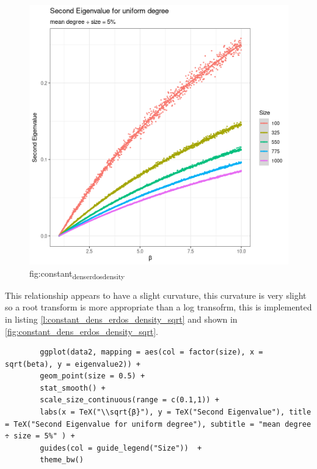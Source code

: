 \documentclass[11pt]{report}
\begin{document}
\begin{figure}[htbp]
\centering
\includegraphics[width=12cm]{media/constant_dens_erdos_density.png}
\caption{\label{fig:constant_dens_erdos_density}fig:constant\textsubscript{dens}\textsubscript{erdos}\textsubscript{density}}
\end{figure}

This relationship appears to have a slight curvature, this curvature is very slight so a root transform is more appropriate than a log transofrm, this is implemented in listing \ref{l:constant_dens_erdos_density_sqrt}  and shown in \ref{fig:constant_dens_erdos_density_sqrt}.

\begin{listing}[htbp]
    \begin{tcolorbox}
        \begin{verbatim}
        ggplot(data2, mapping = aes(col = factor(size), x = sqrt(beta), y = eigenvalue2)) +
        geom_point(size = 0.5) +
        stat_smooth() +
        scale_size_continuous(range = c(0.1,1)) +
        labs(x = TeX("\\sqrt{β}"), y = TeX("Second Eigenvalue"), title = TeX("Second Eigenvalue for uniform degree"), subtitle = "mean degree ÷ size = 5%" ) +
        guides(col = guide_legend("Size"))  +
        theme_bw()
        \end{verbatim}
    \end{tcolorbox}
\caption{\label{l:constant_dens_erdos_density_sqrt}listing:constant\textsubscript{size}\textsubscript{erdos}\textsubscript{density}\textsubscript{sqrt}}
\end{listing}
\end{document}
